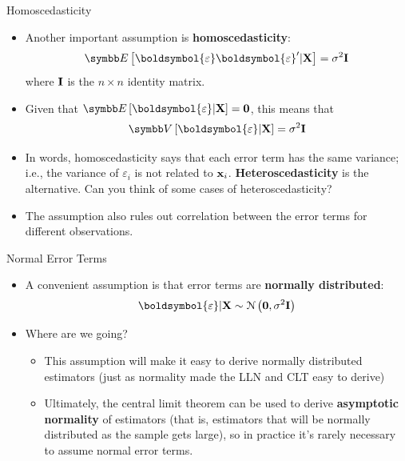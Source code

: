 \documentclass[aspectratio=169,11pt]{beamer}
\begin{document}
\begin{frame}{Homoscedasticity}
\begin{itemize}
	\item Another important assumption is {\bf homoscedasticity}:\[
		\E\left[\boldsymbol{\varepsilon} \boldsymbol{\varepsilon}' | {\bf X} \right] = \sigma^{2} {\bf I}
	\]
	where ${\bf I}$ is the $n \times n$ identity matrix.

	\medskip
	\item Given that $\E\left[\boldsymbol{\varepsilon}|{\bf X}\right] =  {\bf 0}$, this means that\[
	\Var\left[\boldsymbol{\varepsilon} | {\bf X} \right] = \sigma^{2} {\bf I}
	\]

	\item In words, homoscedasticity says that each error term has the same variance; i.e.,   
	the variance of $\varepsilon_i$ is not related to ${\bf x}_i$. {\bf Heteroscedasticity}
	is the alternative. Can you think of some cases of heteroscedasticity? 

	\item The assumption also rules out correlation between the error terms for different observations.
	
\end{itemize}
\end{frame}



\begin{frame}{Normal Error Terms}
\begin{itemize}
	\item A convenient assumption 
	 is that error terms are {\bf normally distributed}:\[
		\boldsymbol{\varepsilon} | {\bf X} \sim \mathcal{N}\left({\bf 0},\sigma^2 {\bf I}\right)
	\]

	\medskip
	\item Where are we going?
	\begin{itemize}
		\item This assumption will make it easy to derive normally distributed estimators (just as
			normality made the LLN and CLT easy to derive)
		\item Ultimately, the central limit theorem can be used to derive {\bf asymptotic normality}
				of estimators (that is, estimators that will be normally distributed as the sample gets large),
				so in practice it's rarely necessary to assume normal error terms. 
	\end{itemize}

\end{itemize}
\end{frame}
\end{document}
